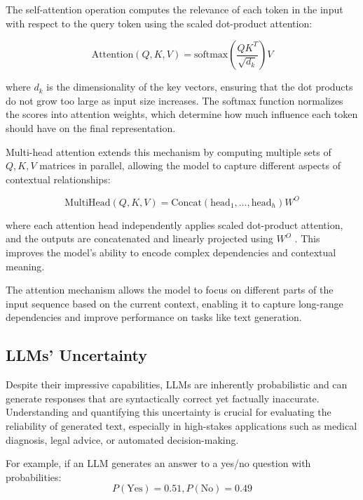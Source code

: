 The self-attention operation computes the relevance of each token in the input with
respect to the query token using the scaled dot-product attention:

\begin{displaymath}
  \mbox{Attention}(Q, K, V) = \mbox{softmax}\left(\frac{QK^{T}}{\sqrt{d_{k}}}\right
  ) V
\end{displaymath}

where $d_{k}$ is the dimensionality of the key vectors, ensuring that the dot products
do not grow too large as input size increases. The softmax function normalizes
the scores into attention weights, which determine how much influence each token
should have on the final representation.

Multi-head attention extends this mechanism by computing multiple sets of $Q,K,V$
matrices in parallel, allowing the model to capture different aspects of
contextual relationships:

\begin{displaymath}
  \mbox{MultiHead}(Q, K, V) = \mbox{Concat}(\mbox{head}_{1}, \dots, \mbox{head}_{h}
  ) W^{O}
\end{displaymath}

where each attention head independently applies scaled dot-product attention,
and the outputs are concatenated and linearly projected using $W^{O}$ . This
improves the model's ability to encode complex dependencies and contextual
meaning.

The attention mechanism allows the model to focus on different parts of the
input sequence based on the current context, enabling it to capture long-range dependencies
and improve performance on tasks like text generation.

\subsection{LLMs' Uncertainty}
\label{sub:llms_uncertainty}

Despite their impressive capabilities, LLMs are inherently probabilistic and can
generate responses that are syntactically correct yet factually inaccurate.
Understanding and quantifying this uncertainty is crucial for evaluating the
reliability of generated text, especially in high-stakes applications such as medical
diagnosis, legal advice, or automated decision-making.

For example, if an LLM generates an answer to a yes/no question with
probabilities:
\begin{displaymath}
  P(\mbox{Yes})=0.51,P(\mbox{No})=0.49
\end{displaymath}

